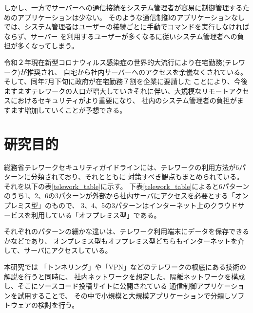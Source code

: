 \documentclass[11pt,a4j,titlepage]{jreport}
\begin{document}
しかし、一方でサーバーへの通信接続をシステム管理者が容易に制御管理するためのアプリケーションは少ない。
そのような通信制御のアプリケーションなしでは、システム管理者はユーザーの接続ごとに手動でコマンドを実行しなければならず、サーバー
を利用するユーザーが多くなるに従いシステム管理者への負担が多くなってしまう。\par
令和２年現在新型コロナウィルス感染症の世界的大流行により在宅勤務(テレワーク)が推奨され、
自宅から社内サーバーへのアクセスを余儀なくされている。そして、同年7月下旬に政府が在宅勤務７割を企業に要請した\cite{covid_nikkei}
ことにより、今後ますますテレワークの人口が増大していきそれに伴い、大規模なリモートアクセスにおけるセキュリティがより重要になり、
社内のシステム管理者の負担がますます増加していくことが予想できる。\par 





\section{研究目的}


総務省テレワークセキュリティガイドライン\cite{telework_guideline}には、テレワークの利用方法が6パターンに分類されており、それとともに
対策すべき観点もまとめられている。それを以下の表\ref{telework_table}に示す。
下表\ref{telework_table}によると6パターンのうち1、2、6の3パターンが外部から社内サーバにアクセスを必要とする「オンプレミス型」のもので、
3、4、5の3パターンはインターネット上のクラウドサービスを利用している「オフプレミス型」である。

それぞれのパターンの細かな違いは、テレワーク利用端末にデータを保存できるかなどであり、
オンプレミス型もオフプレミス型どちらもインターネットを介して、サーバにアクセスしている。
\par 本研究では
「トンネリング」や「VPN」などのテレワークの根底にある技術の解説を行うと同時に、
社内ネットワークを想定した、隔離ネットワークを構成し、そこにソースコード投稿サイトに公開されている
通信制御アプリケーションを試用することで、
その中で小規模と大規模アプリケーションで分類しソフトウェアの検討を行う。
\end{document}
